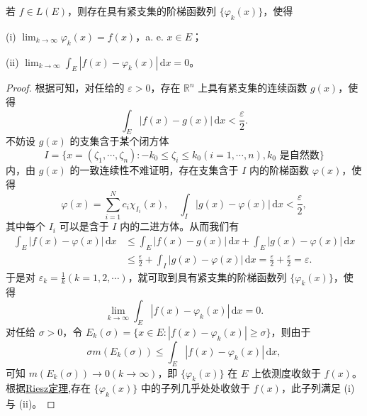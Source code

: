 \documentclass[../../main.tex]{subfiles}%
\begin{document}
\begin{corollary}\label{corollary:推论4.22}
若 \( f \in L(E) \)，则存在具有紧支集的阶梯函数列 \( \{\varphi_k(x)\} \)，使得

(i) \( \lim_{k \to \infty} \varphi_k(x) = f(x) \)，a. e. \( x \in E \)；

(ii) \( \lim_{k \to \infty} \int_E |f(x) - \varphi_k(x)| \, \mathrm{d}x = 0 \)。
\end{corollary}
\begin{proof}

根据可知，对任给的 \( \varepsilon > 0 \)，存在 \( \mathbb{R}^n \) 上具有紧支集的连续函数 \( g(x) \)，使得
\[
\int_E |f(x) - g(x)| \, \mathrm{d}x < \frac{\varepsilon}{2}.
\]
不妨设 \( g(x) \) 的支集含于某个闭方体
\[
I = \{ x = (\zeta_1, \cdots, \zeta_n) : -k_0 \leqslant \zeta_i \leqslant k_0 (i = 1, \cdots, n), k_0 \text{ 是自然数} \}
\]
内，由 \( g(x) \) 的一致连续性不难证明，存在支集含于 \( I \) 内的阶梯函数 \( \varphi(x) \)，使得
\[
\varphi(x) = \sum_{i=1}^N c_i \chi_{I_i}(x), \quad \int_I |g(x) - \varphi(x)| \, \mathrm{d}x < \frac{\varepsilon}{2},
\]
其中每个 \( I_i \) 可以是含于 \( I \) 内的二进方体。从而我们有
\begin{align*}
\int_E |f(x) - \varphi(x)| \, \mathrm{d}x &\leqslant \int_E |f(x) - g(x)| \, \mathrm{d}x + \int_E |g(x) - \varphi(x)| \, \mathrm{d}x \\
&\leqslant \frac{\varepsilon}{2} + \int_I |g(x) - \varphi(x)| \, \mathrm{d}x = \frac{\varepsilon}{2} + \frac{\varepsilon}{2} = \varepsilon.
\end{align*}
于是对 \( \varepsilon_k = \frac{1}{k} (k = 1, 2, \cdots) \)，就可取到具有紧支集的阶梯函数列 \( \{\varphi_k(x)\} \)，使得
\[
\lim_{k \to \infty} \int_E |f(x) - \varphi_k(x)| \, \mathrm{d}x = 0.
\]
对任给 \( \sigma > 0 \)，令 \( E_k(\sigma) = \{ x \in E : |f(x) - \varphi_k(x)| \geqslant \sigma \} \)，则由于
\[
\sigma m(E_k(\sigma)) \leqslant \int_E |f(x) - \varphi_k(x)| \, \mathrm{d}x,
\]
可知 \( m(E_k(\sigma)) \to 0 (k \to \infty) \)，即 \( \{\varphi_k(x)\} \) 在 \( E \) 上依测度收敛于 \( f(x) \)。
根据\hyperref[theorem:Riesz定理]{Riesz定理},存在 \( \{\varphi_k(x)\} \) 中的子列几乎处处收敛于 \( f(x) \)，此子列满足 (i) 与 (ii)。

\end{proof}
\end{document}
